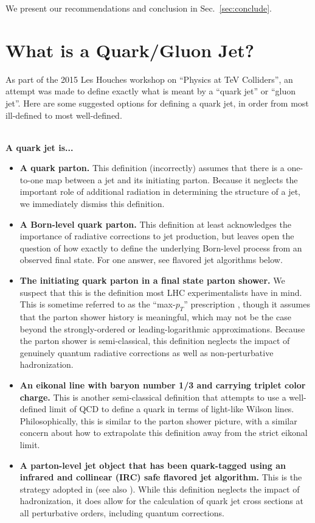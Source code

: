 \documentclass[11pt,letterpaper]{article}
\DeclareRobustCommand{\Sec}[1]{Sec.~\ref{#1}}
\begin{document}
We present our recommendations and conclusion in \Sec{sec:conclude}.

\section{What is a Quark/Gluon Jet?}
\label{sec:quarkgluondef}

As part of the 2015 Les Houches workshop on ``Physics at TeV Colliders'', an attempt was made to define exactly what is meant by a ``quark jet'' or ``gluon jet''.  Here are some suggested options for defining a quark jet, in order from most ill-defined to most well-defined.

~\\
\noindent \textbf{A quark jet is...}
\begin{itemize}
\item \textbf{A quark parton.}  This definition (incorrectly) assumes that there is a one-to-one map between a jet and its initiating parton.  Because it neglects the important role of additional radiation in determining the structure of a jet, we immediately dismiss this definition.
\item \textbf{A Born-level quark parton.}  This definition at least acknowledges the importance of radiative corrections to jet production, but leaves open the question of how exactly to define the underlying Born-level process from an observed final state.  For one answer, see flavored jet algorithms below.
\item \textbf{The initiating quark parton in a final state parton shower.}  We suspect that this is the definition most LHC experimentalists have in mind.  This is sometime referred to as the ``max-$p_T$'' prescription \cite{}, though it assumes that the parton shower history is meaningful, which may not be the case beyond the strongly-ordered or leading-logarithmic approximations.  Because the parton shower is semi-classical, this definition neglects the impact of genuinely quantum radiative corrections as well as non-perturbative hadronization. 
\item \textbf{An eikonal line with baryon number 1/3 and carrying triplet color charge.}  This is another semi-classical definition that attempts to use a well-defined limit of QCD to define a quark in terms of light-like Wilson lines.  Philosophically, this is similar to the parton shower picture, with a similar concern about how to extrapolate this definition away from the strict eikonal limit.
\item \textbf{A parton-level jet object that has been quark-tagged using an infrared and collinear (IRC) safe flavored jet algorithm.}  This is the strategy adopted in \cite{} (see also \cite{}).  While this definition neglects the impact of hadronization, it does allow for the calculation of quark jet cross sections at all perturbative orders, including quantum corrections.
\end{itemize}
\end{document}
